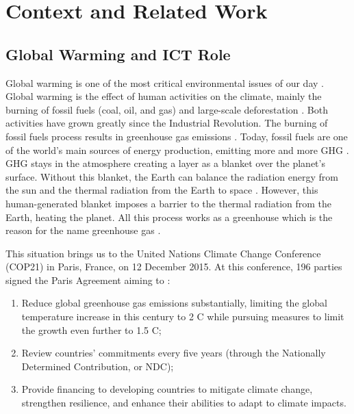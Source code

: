 \chapter{Context and Related Work}
\label{cha:related_work}
\minitoc

\section{Global Warming and ICT Role}
Global warming is one of the most critical environmental issues of our day \cite{houghton2005global}. Global warming is the effect of human activities on the climate, mainly the burning of fossil fuels (coal, oil, and gas) and large-scale deforestation \cite{houghton2005global}. Both activities have grown greatly since the Industrial Revolution. The burning of fossil fuels process results in greenhouse gas emissions \cite{olabi2022renewable}. Today, fossil fuels are one of the world's main sources of energy production, emitting more and more GHG \cite{olabi2022renewable}. GHG stays in the atmosphere creating a layer as a blanket over the planet's surface. Without this blanket, the Earth can balance the radiation energy from the sun and the thermal radiation from the Earth to space \cite{houghton2005global}. However, this human-generated blanket imposes a barrier to the thermal radiation from the Earth, heating the planet. All this process works as a greenhouse which is the reason for the name greenhouse gas \cite{houghton2005global}.

This situation brings us to the United Nations Climate Change Conference (COP21) in Paris, France, on 12 December 2015. At this conference, 196 parties signed the Paris Agreement aiming to \cite{nations_paris_nodate}:
\begin{enumerate}
    \item Reduce global greenhouse gas emissions substantially, limiting the global temperature increase in this century to 2 \degree C while pursuing measures to limit the growth even further to 1.5 \degree C;
    \item Review countries’ commitments every five years (through the Nationally Determined Contribution, or NDC);
    \item Provide financing to developing countries to mitigate climate change, strengthen resilience, and enhance their abilities to adapt to climate impacts. 
\end{enumerate}

